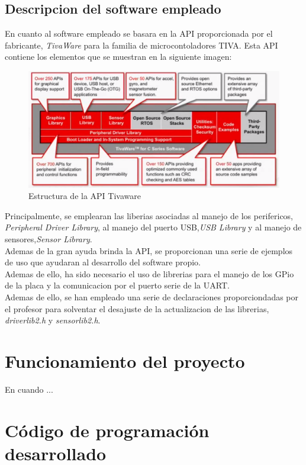 \documentclass[a4paper,twoside]{article}
\begin{document}
\subsection{Descripcion del software empleado}
En cuanto al software empleado se basara en la API proporcionada por el fabricante, \textit{TivaWare} para la familia de microcontoladores TIVA. Esta API contiene los elementos que se muestran en la siguiente imagen:\\
\begin{figure}[h!]
 \centering
 \includegraphics[width=.8\textwidth]{../images/tivaware_struct}
 \caption{Estructura de la API Tivaware}
\end{figure}

Principalmente, se emplearan las liberias asociadas al manejo de los perifericos, \textit{Peripheral Driver Library}, al manejo del puerto USB,\textit{USB Library} y al manejo de sensores,\textit{Sensor Library}. \\
Ademas de la gran ayuda brinda la API, se proporcionan una serie de ejemplos de uso que ayudaran al desarrollo del software propio. \\

Ademas de ello, ha sido necesario el uso de librerias para el manejo de los GPio de la placa y la comunicacion por el puerto serie de la UART. \\
Ademas de ello, se han empleado una serie de declaraciones proporciondadas por el profesor para solventar el desajuste de la actualizacion de las librerias, \textit{driverlib2.h} y \textit{sensorlib2.h}.

\newpage
\section{Funcionamiento del proyecto}
En cuando ...

\section{Código de programación desarrollado}
\end{document}
